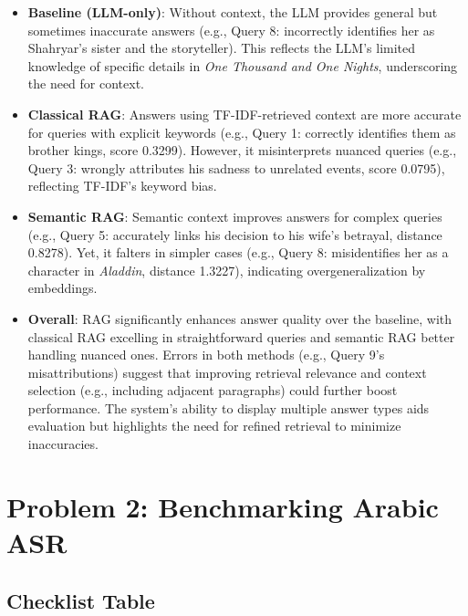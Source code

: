 \documentclass[12pt]{article}
\begin{document}
\begin{itemize}
    \item \textbf{Baseline (LLM-only)}: Without context, the LLM provides general but sometimes inaccurate answers (e.g., Query 8: \arabicfont {} incorrectly identifies her as Shahryar’s sister and the storyteller). This reflects the LLM’s limited knowledge of specific details in \textit{One Thousand and One Nights}, underscoring the need for context.

    \item \textbf{Classical RAG}: Answers using TF-IDF-retrieved context are more accurate for queries with explicit keywords (e.g., Query 1: \arabicfont {} correctly identifies them as brother kings, score 0.3299). However, it misinterprets nuanced queries (e.g., Query 3: \arabicfont {} wrongly attributes his sadness to unrelated events, score 0.0795), reflecting TF-IDF’s keyword bias.

    \item \textbf{Semantic RAG}: Semantic context improves answers for complex queries (e.g., Query 5: \arabicfont {} accurately links his decision to his wife’s betrayal, distance 0.8278). Yet, it falters in simpler cases (e.g., Query 8: \arabicfont {} misidentifies her as a character in \textit{Aladdin}, distance 1.3227), indicating overgeneralization by embeddings.

    \item \textbf{Overall}: RAG significantly enhances answer quality over the baseline, with classical RAG excelling in straightforward queries and semantic RAG better handling nuanced ones. Errors in both methods (e.g., Query 9’s misattributions) suggest that improving retrieval relevance and context selection (e.g., including adjacent paragraphs) could further boost performance. The system’s ability to display multiple answer types aids evaluation but highlights the need for refined retrieval to minimize inaccuracies.
\end{itemize}


\section{Problem 2: Benchmarking Arabic ASR}
\subsection{Checklist Table}
\end{document}
